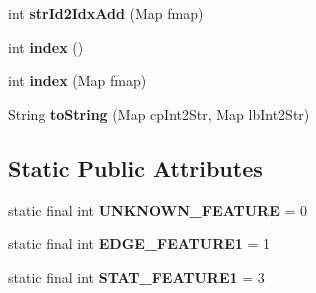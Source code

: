 \begin{DoxyCompactItemize}
\item 
\hypertarget{classcrf_1_1tagger_1_1Feature_a8ad2bd9851af1c7b41c5db45ef51b597}{
int {\bfseries strId2IdxAdd} (Map fmap)}
\label{classcrf_1_1tagger_1_1Feature_a8ad2bd9851af1c7b41c5db45ef51b597}

\item 
\hypertarget{classcrf_1_1tagger_1_1Feature_a06f97f9d1d21654d103b3b7cb7b96f3a}{
int {\bfseries index} ()}
\label{classcrf_1_1tagger_1_1Feature_a06f97f9d1d21654d103b3b7cb7b96f3a}

\item 
\hypertarget{classcrf_1_1tagger_1_1Feature_a231c1bb279947c6b43b1ae83eed65261}{
int {\bfseries index} (Map fmap)}
\label{classcrf_1_1tagger_1_1Feature_a231c1bb279947c6b43b1ae83eed65261}

\item 
\hypertarget{classcrf_1_1tagger_1_1Feature_a01e1599d91e436146d8a8e553e516f09}{
String {\bfseries toString} (Map cpInt2Str, Map lbInt2Str)}
\label{classcrf_1_1tagger_1_1Feature_a01e1599d91e436146d8a8e553e516f09}

\end{DoxyCompactItemize}
\subsection*{Static Public Attributes}
\begin{DoxyCompactItemize}
\item 
\hypertarget{classcrf_1_1tagger_1_1Feature_a948db953a912a8ef6ae742c359e5d428}{
static final int {\bfseries UNKNOWN\_\-FEATURE} = 0}
\label{classcrf_1_1tagger_1_1Feature_a948db953a912a8ef6ae742c359e5d428}

\item 
\hypertarget{classcrf_1_1tagger_1_1Feature_a35c32698c326e2ecf83768cb817cc7eb}{
static final int {\bfseries EDGE\_\-FEATURE1} = 1}
\label{classcrf_1_1tagger_1_1Feature_a35c32698c326e2ecf83768cb817cc7eb}

\item 
\hypertarget{classcrf_1_1tagger_1_1Feature_a5b3b6afef6fa2ec3a8b5542b791c859e}{
static final int {\bfseries STAT\_\-FEATURE1} = 3}
\label{classcrf_1_1tagger_1_1Feature_a5b3b6afef6fa2ec3a8b5542b791c859e}

\end{DoxyCompactItemize}
